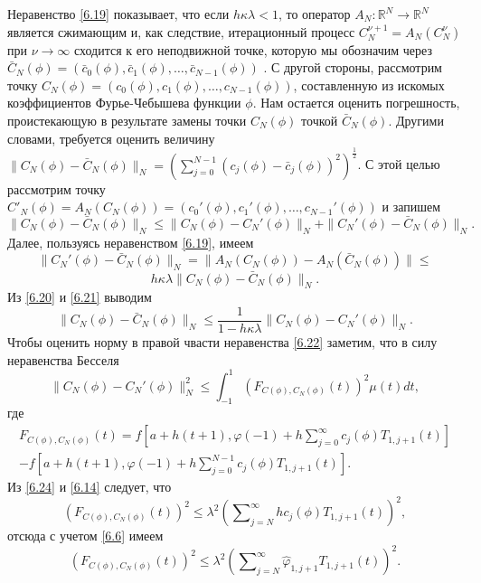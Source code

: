 Неравенство \eqref{6.19} показывает, что если $h\kappa\lambda<1$, то оператор  $A_N:\mathbb{R}^N\to \mathbb{R}^N$ является сжимающим и, как следствие, итерационный процесс $C_N^{\nu+1}=A_N(C_N^{\nu})$  при $\nu\to\infty$ сходится к его неподвижной точке, которую мы обозначим через  $\bar C_N(\phi)=(\bar c_0(\phi),\bar c_1(\phi),\ldots,\bar c_{N-1}(\phi))$ . С другой стороны, рассмотрим точку $C_N(\phi)=(c_0(\phi),c_1(\phi),\ldots,c_{N-1}(\phi))$, составленную из искомых коэффициентов Фурье-Чебышева функции $\phi$. Нам остается оценить погрешность, проистекающую в результате замены точки $C_N(\phi)$ точкой $\bar C_N(\phi)$. Другими словами, требуется оценить величину
$\|C_N(\phi)-\bar C_N(\phi)\|_N= \left(\sum_{j=0}^{N-1}(c_j(\phi)-\bar c_j(\phi))^2\right)^\frac12$. С этой целью рассмотрим точку $C'_N(\phi)=A_N(C_N(\phi))=(c_0'(\phi),c_1'(\phi),\ldots,c_{N-1}'(\phi))$ и запишем
\begin{equation}\label{6.20}
\|C_N(\phi)-\bar C_N(\phi)\|_N\le \|C_N(\phi)- C_N'(\phi)\|_N+\|C_N'(\phi)-\bar C_N(\phi)\|_N.
\end{equation}
Далее, пользуясь неравенством \eqref{6.19}, имеем
$$
\|C_N'(\phi)-\bar C_N(\phi)\|_N=\|A_N(C_N(\phi))-A_N(\bar C_N(\phi))\|\le
$$
\begin{equation}\label{6.21}
h\kappa\lambda\|C_N(\phi)-\bar C_N(\phi)\|_N.
\end{equation}
Из \eqref{6.20} и \eqref{6.21} выводим
\begin{equation}\label{6.22}
\|C_N(\phi)-\bar C_N(\phi)\|_N\le \frac1{1-h\kappa\lambda}\|C_N(\phi)- C_N'(\phi)\|_N.
\end{equation}
Чтобы оценить норму в правой чвасти неравенства \eqref{6.22} заметим, что в силу неравенства Бесселя
\begin{equation}\label{6.23}
\|C_N(\phi)- C_N'(\phi)\|_N^2\le \int_{-1}^1(F_{C(\phi),C_N(\phi)}(t))^2 \mu(t)dt,
\end{equation}
где
\begin{multline}\label{6.24}
 F_{C(\phi),C_N(\phi)}(t)=f\left[a+h(t+1),\varphi(-1)+ h\sum\nolimits_{j=0}^\infty c_j(\phi)T_{1,j+1}(t)\right] \\
  -f\left[a+h(t+1),\varphi(-1)+ h\sum\nolimits_{j=0}^{N-1}c_j(\phi)T_{1,j+1}(t)\right].
\end{multline}
Из \eqref{6.24} и \eqref{6.14} следует, что
$$
(F_{C(\phi),C_N(\phi)}(t))^2\le \lambda^2   \left(\sum\nolimits_{j=N}^\infty hc_j(\phi)T_{1,j+1}(t)\right)^2,
$$
отсюда с учетом \eqref{6.6} имеем
\begin{equation}\label{6.25}
(F_{C(\phi),C_N(\phi)}(t))^2\le \lambda^2   \left(\sum\nolimits_{j=N}^\infty \hat \varphi_{1,j+1}T_{1,j+1}(t)\right)^2.
\end{equation}
